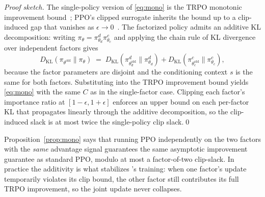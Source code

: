 \begin{proof}[Proof sketch]
The single-policy version of \eqref{eq:mono} is the TRPO monotonic
improvement bound~\cite{schulman2015trpo}; PPO's clipped surrogate
inherits the bound up to a clip-induced gap that vanishes as
$\epsilon\to 0$~\cite{schulman2017ppo}. The factorized policy admits an
additive KL decomposition: writing
$\pi_{\theta}=\pi^{d}_{\theta_{d}}\pi^{c}_{\theta_{c}}$ and applying
the chain rule of KL divergence over independent factors gives
\begin{equation*}
D_{\mathrm{KL}}(\pi_{\theta^{\mathrm{old}}}\|\pi_{\theta})
\;=\; D_{\mathrm{KL}}(\pi^{d}_{\theta^{\mathrm{old}}_{d}}\|\pi^{d}_{\theta_{d}})
+ D_{\mathrm{KL}}(\pi^{c}_{\theta^{\mathrm{old}}_{c}}\|\pi^{c}_{\theta_{c}}),
\end{equation*}
because the factor parameters are disjoint and the conditioning context
$s$ is the same for both factors. Substituting into the TRPO improvement
bound yields \eqref{eq:mono} with the same $C$ as in the single-factor
case. Clipping each factor's importance ratio at
$[1-\epsilon,1+\epsilon]$ enforces an upper bound on each per-factor KL
that propagates linearly through the additive decomposition, so the
clip-induced slack is at most twice the single-policy clip slack.\qed
\end{proof}

Proposition~\ref{prop:mono} says that running PPO independently on the
two factors with the \emph{same} advantage signal guarantees the same
asymptotic improvement guarantee as standard PPO, modulo at most a
factor-of-two clip-slack. In practice the additivity is what stabilizes
\method's training: when one factor's update temporarily violates its
clip bound, the other factor still contributes its full TRPO
improvement, so the joint update never collapses.

